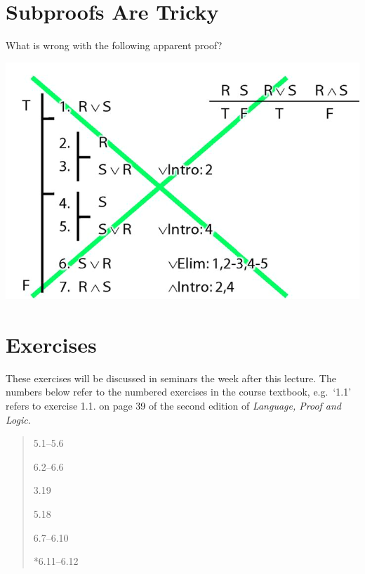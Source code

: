 \documentclass[12pt]{extarticle}
\begin{document}
\begin{multicols*}{3}
 
\section{Subproofs Are Tricky}
 
What is wrong with the following apparent proof?
 
\begin{center}
\includegraphics[scale=0.3]{img/unit_224_subproofs_tricky.png}
\end{center}
\vfill
\begin{minipage}{\columnwidth}
\section{Exercises}
These exercises will be discussed in seminars the week after this lecture.
The numbers below refer to the numbered exercises in the course textbook, e.g.\ `1.1' refers to exercise 1.1. on page 39 of the second edition of \emph{Language, Proof and Logic}.
 
\begin{quote}
5.1--5.6
 
6.2--6.6
 
3.19
 
5.18
 
6.7--6.10
 
*6.11--6.12
 
\end{quote}
\end{minipage}


 


\end{multicols*}
\end{document}
